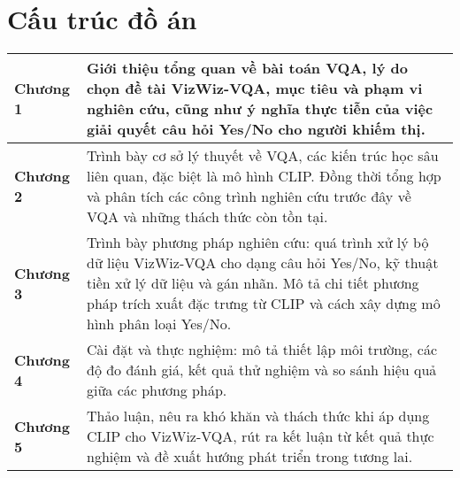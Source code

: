 \chapter*{\centering\Large{Cấu trúc đồ án}}

\begin{tabular}{| p{} | p{} |}
\hline
\textbf{Chương 1} & Giới thiệu tổng quan về bài toán VQA, lý do chọn đề tài VizWiz-VQA, 
mục tiêu và phạm vi nghiên cứu, cũng như ý nghĩa thực tiễn của việc giải quyết câu hỏi Yes/No cho người khiếm thị. \\
\hline
\textbf{Chương 2} & Trình bày cơ sở lý thuyết về VQA, các kiến trúc học sâu liên quan, đặc biệt là mô hình CLIP. 
Đồng thời tổng hợp và phân tích các công trình nghiên cứu trước đây về VQA và những thách thức còn tồn tại. \\
\hline
\textbf{Chương 3} & Trình bày phương pháp nghiên cứu: quá trình xử lý bộ dữ liệu VizWiz-VQA cho dạng câu hỏi Yes/No, 
kỹ thuật tiền xử lý dữ liệu và gán nhãn. Mô tả chi tiết phương pháp trích xuất đặc trưng từ CLIP 
và cách xây dựng mô hình phân loại Yes/No. \\
\hline
\textbf{Chương 4} & Cài đặt và thực nghiệm: mô tả thiết lập môi trường, các độ đo đánh giá, 
kết quả thử nghiệm và so sánh hiệu quả giữa các phương pháp. \\
\hline
\textbf{Chương 5} & Thảo luận, nêu ra khó khăn và thách thức khi áp dụng CLIP cho VizWiz-VQA, 
rút ra kết luận từ kết quả thực nghiệm và đề xuất hướng phát triển trong tương lai. \\
\hline
\end{tabular}
